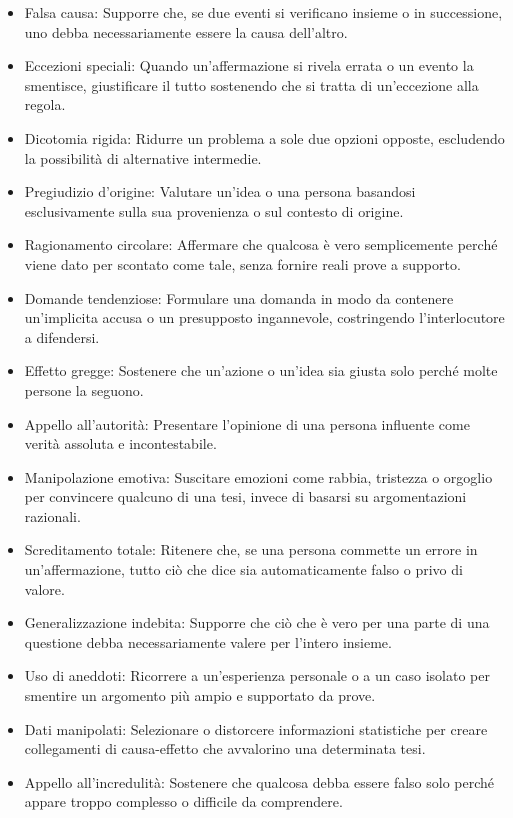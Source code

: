 \documentclass[12pt]{book} %
\begin{document}
\begin{itemize}
\item Falsa causa: Supporre che, se due eventi si verificano insieme o in successione, uno debba necessariamente essere la causa dell’altro.
\item Eccezioni speciali: Quando un'affermazione si rivela errata o un evento la smentisce, giustificare il tutto sostenendo che si tratta di un'eccezione alla regola.
\item Dicotomia rigida: Ridurre un problema a sole due opzioni opposte, escludendo la possibilità di alternative intermedie.
\item Pregiudizio d'origine: Valutare un'idea o una persona basandosi esclusivamente sulla sua provenienza o sul contesto di origine.
\item Ragionamento circolare: Affermare che qualcosa è vero semplicemente perché viene dato per scontato come tale, senza fornire reali prove a supporto.
\item Domande tendenziose: Formulare una domanda in modo da contenere un'implicita accusa o un presupposto ingannevole, costringendo l’interlocutore a difendersi.
\item Effetto gregge: Sostenere che un'azione o un’idea sia giusta solo perché molte persone la seguono.
\item Appello all’autorità: Presentare l’opinione di una persona influente come verità assoluta e incontestabile.
\item Manipolazione emotiva: Suscitare emozioni come rabbia, tristezza o orgoglio per convincere qualcuno di una tesi, invece di basarsi su argomentazioni razionali.
\item Screditamento totale: Ritenere che, se una persona commette un errore in un'affermazione, tutto ciò che dice sia automaticamente falso o privo di valore.
\item Generalizzazione indebita: Supporre che ciò che è vero per una parte di una questione debba necessariamente valere per l’intero insieme.
\item Uso di aneddoti: Ricorrere a un’esperienza personale o a un caso isolato per smentire un argomento più ampio e supportato da prove.
\item Dati manipolati: Selezionare o distorcere informazioni statistiche per creare collegamenti di causa-effetto che avvalorino una determinata tesi.
\item Appello all’incredulità: Sostenere che qualcosa debba essere falso solo perché appare troppo complesso o difficile da comprendere.

\end{itemize}
\end{document}
